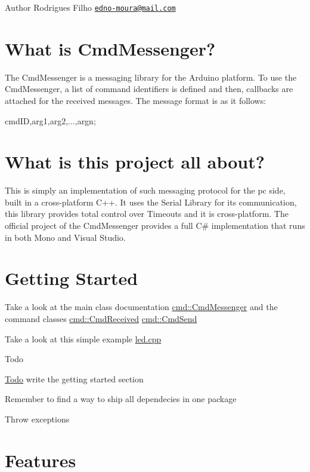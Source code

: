\begin{DoxyAuthor}{Author}
Rodrigues Filho \href{mailto:edno-moura@mail.com}{\tt edno-\/moura@mail.\+com}
\end{DoxyAuthor}
\hypertarget{index_what_is}{}\section{What is Cmd\+Messenger?}\label{index_what_is}
The Cmd\+Messenger is a messaging library for the Arduino platform. To use the Cmd\+Messenger, a list of command identifiers is defined and then, callbacks are attached for the received messages. The message format is as it follows\+: 
\begin{DoxyPre}
  cmdID,arg1,arg2,...,argn;
\end{DoxyPre}
\hypertarget{index_this_project}{}\section{What is this project all about?}\label{index_this_project}
This is simply an implementation of such messaging protocol for the pc side, built in a cross-\/platform C++. It uses the Serial Library for its communication, this library provides total control over Timeouts and it is cross-\/platform. The official project of the Cmd\+Messenger provides a full C\# implementation that runs in both Mono and Visual Studio.\hypertarget{index_getting_started}{}\section{Getting Started}\label{index_getting_started}
Take a look at the main class documentation \hyperlink{classcmd_1_1_cmd_messenger}{cmd\+::\+Cmd\+Messenger} and the command classes \hyperlink{classcmd_1_1_cmd_received}{cmd\+::\+Cmd\+Received} \hyperlink{classcmd_1_1_cmd_send}{cmd\+::\+Cmd\+Send}

Take a look at this simple example \hyperlink{led_8cpp}{led.\+cpp}

\begin{DoxyRefDesc}{Todo}
\item[\hyperlink{todo__todo000001}{Todo}]write the getting started section 

Remember to find a way to ship all dependecies in one package 

Throw exceptions\end{DoxyRefDesc}
\hypertarget{index_features}{}\section{Features}\label{index_features}

